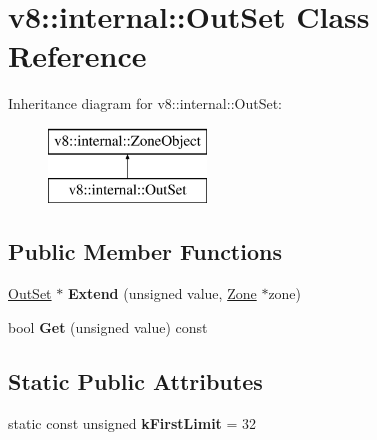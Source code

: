 \hypertarget{classv8_1_1internal_1_1_out_set}{}\section{v8\+:\+:internal\+:\+:Out\+Set Class Reference}
\label{classv8_1_1internal_1_1_out_set}
Inheritance diagram for v8\+:\+:internal\+:\+:Out\+Set\+:\begin{figure}[H]
\begin{center}
\leavevmode
\includegraphics[height=2.000000cm]{classv8_1_1internal_1_1_out_set}
\end{center}
\end{figure}
\subsection*{Public Member Functions}
\begin{DoxyCompactItemize}
\item 
\hypertarget{classv8_1_1internal_1_1_out_set_aa6bc55c84c74372ed1fc4e05019d832f}{}\hyperlink{classv8_1_1internal_1_1_out_set}{Out\+Set} $\ast$ {\bfseries Extend} (unsigned value, \hyperlink{classv8_1_1internal_1_1_zone}{Zone} $\ast$zone)\label{classv8_1_1internal_1_1_out_set_aa6bc55c84c74372ed1fc4e05019d832f}

\item 
\hypertarget{classv8_1_1internal_1_1_out_set_a28cdeaa3e46526dd1269d8ab24838844}{}bool {\bfseries Get} (unsigned value) const \label{classv8_1_1internal_1_1_out_set_a28cdeaa3e46526dd1269d8ab24838844}

\end{DoxyCompactItemize}
\subsection*{Static Public Attributes}
\begin{DoxyCompactItemize}
\item 
\hypertarget{classv8_1_1internal_1_1_out_set_ae14ea3db294239b6b919d9bb2b42f82c}{}static const unsigned {\bfseries k\+First\+Limit} = 32\label{classv8_1_1internal_1_1_out_set_ae14ea3db294239b6b919d9bb2b42f82c}

\end{DoxyCompactItemize}
